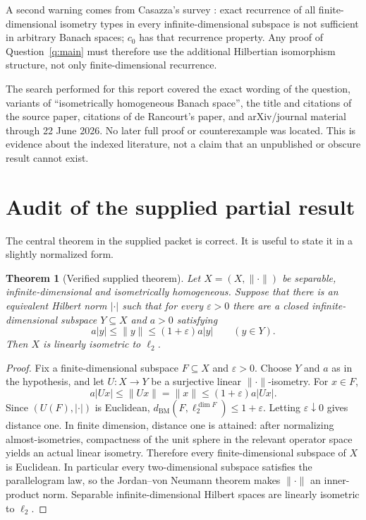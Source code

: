 \documentclass[11pt]{article}
\newtheorem{theorem}{Theorem}[section]
\theoremstyle{definition}
\begin{document}
A second warning comes from Casazza's survey \cite{Casazza}: exact recurrence
of all finite-dimensional isometry types in every infinite-dimensional
subspace is not sufficient in arbitrary Banach spaces; $c_0$ has that
recurrence property.  Any proof of Question~\ref{q:main} must therefore use the
additional Hilbertian isomorphism structure, not only finite-dimensional
recurrence.

The search performed for this report covered the exact wording of the
question, variants of ``isometrically homogeneous Banach space'', the title
and citations of the source paper, citations of de Rancourt's paper, and
arXiv/journal material through 22 June 2026.  No later full proof or
counterexample was located.  This is evidence about the indexed literature,
not a claim that an unpublished or obscure result cannot exist.

\section{Audit of the supplied partial result}\label{sec:audit}

The central theorem in the supplied packet is correct.  It is useful to state
it in a slightly normalized form.

\begin{theorem}[Verified supplied theorem]\label{thm:supplied}
Let $X=(X,\|\cdot\|)$ be separable, infinite-dimensional and isometrically
homogeneous.  Suppose that there is an equivalent Hilbert norm $|\cdot|$ such
that for every $\varepsilon>0$ there are a closed infinite-dimensional
subspace $Y\subseteq X$ and $a>0$ satisfying
\[
 a|y|\leq \|y\|\leq (1+\varepsilon)a|y|
 \qquad(y\in Y).
\]
Then $X$ is linearly isometric to $\ell_2$.
\end{theorem}

\begin{proof}
Fix a finite-dimensional subspace $F\subseteq X$ and $\varepsilon>0$.  Choose
$Y$ and $a$ as in the hypothesis, and let $U:X\to Y$ be a surjective linear
$\|\cdot\|$-isometry.  For $x\in F$,
\[
 a|Ux|\leq \|Ux\|=\|x\|\leq(1+\varepsilon)a|Ux|.
\]
Since $(U(F),|\cdot|)$ is Euclidean,
$d_{\mathrm{BM}}(F,\ell_2^{\dim F})\leq1+\varepsilon$.  Letting
$\varepsilon\downarrow0$ gives distance one.  In finite dimension, distance
one is attained: after normalizing almost-isometries, compactness of the unit
sphere in the relevant operator space yields an actual linear isometry.
Therefore every finite-dimensional subspace of $X$ is Euclidean.  In
particular every two-dimensional subspace satisfies the parallelogram law, so
the Jordan--von Neumann theorem makes $\|\cdot\|$ an inner-product norm.
Separable infinite-dimensional Hilbert spaces are linearly isometric to
$\ell_2$.
\end{proof}
\end{document}
